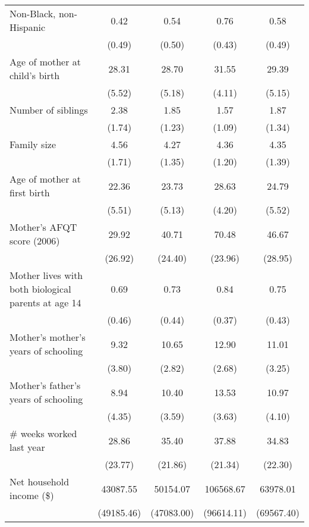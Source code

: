 \begin{table}[htbp]
\begin{tabular}{l*{4}{c}}
\addlinespace
Non-Black, non-Hispanic&        0.42&        0.54&        0.76&        0.58\\
                    &      (0.49)&      (0.50)&      (0.43)&      (0.49)\\
\addlinespace
Age of mother at child's birth&       28.31&       28.70&       31.55&       29.39\\
                    &      (5.52)&      (5.18)&      (4.11)&      (5.15)\\
\addlinespace
Number of siblings  &        2.38&        1.85&        1.57&        1.87\\
                    &      (1.74)&      (1.23)&      (1.09)&      (1.34)\\
\addlinespace
Family size         &        4.56&        4.27&        4.36&        4.35\\
                    &      (1.71)&      (1.35)&      (1.20)&      (1.39)\\
\addlinespace
Age of mother at first birth&       22.36&       23.73&       28.63&       24.79\\
                    &      (5.51)&      (5.13)&      (4.20)&      (5.52)\\
\addlinespace
Mother's AFQT score (2006)&       29.92&       40.71&       70.48&       46.67\\
                    &     (26.92)&     (24.40)&     (23.96)&     (28.95)\\
\addlinespace
Mother lives with both biological parents at age 14&        0.69&        0.73&        0.84&        0.75\\
                    &      (0.46)&      (0.44)&      (0.37)&      (0.43)\\
\addlinespace
Mother's mother's years of schooling&        9.32&       10.65&       12.90&       11.01\\
                    &      (3.80)&      (2.82)&      (2.68)&      (3.25)\\
\addlinespace
Mother's father's years of schooling&        8.94&       10.40&       13.53&       10.97\\
                    &      (4.35)&      (3.59)&      (3.63)&      (4.10)\\
\addlinespace
$\#$ weeks worked last year&       28.86&       35.40&       37.88&       34.83\\
                    &     (23.77)&     (21.86)&     (21.34)&     (22.30)\\
\addlinespace
Net household income (\$)&    43087.55&    50154.07&   106568.67&    63978.01\\
                    &  (49185.46)&  (47083.00)&  (96614.11)&  (69567.40)\\
\bottomrule
\end{tabular}
\end{table}
